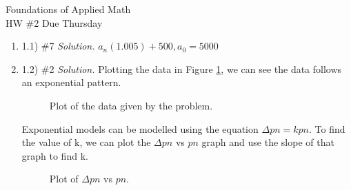 \documentclass[12pt,letterpaper]{article}
\begin{document}
Foundations of Applied Math\\
 HW \#2
 Due Thursday 


\begin{enumerate}

\item 1.1) \#7
  \emph{Solution.} $a_{n}(1.005) + 500, a_{0} = 5000$
\item 1.2) \#2
  \emph{Solution.} 
  Plotting the data in Figure \ref{fig:1}, we can see the data follows an exponential pattern. 

  \begin{figure}[!htb]
    \caption{\label{fig:1} Plot of the data given by the problem.}
  \end{figure}

  Exponential models can be modelled using the equation $\Delta pn = kpn$. To find
  the value of k, we can plot the $\Delta pn$ vs $pn$ graph and use the slope of that 
  graph to find k. 

  \begin{figure}[!htb]
    \caption{\label{fig:2} Plot of $\Delta pn$ vs $pn$.}
  \end{figure}


\end{enumerate}
\end{document}
